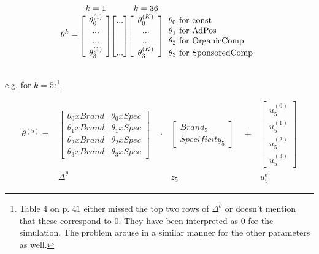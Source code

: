 \begin{equation}
    \theta^k =
        \begin{blockarray}{ccc l}
        k=1 & & k=36 &\\
        \begin{block}{[c][c][c]l}
         \theta^{(1)}_{0} & ... & \theta^{(K)}_{0} & \theta_0 \text{ for const}\\
        ... && ... & \theta_1 \text{ for AdPos}\\
        ... && ... & \theta_2 \text{ for OrganicComp}\\
        \theta^{(1)}_{3} & ... & \theta^{(K)}_{3} & \theta_3 \text{ for SponsoredComp}\\
        \end{block}
        \end{blockarray}
\end{equation}

\begin{center}
    e.g. for $k=5$:\footnote{Table 4 on p. 41 either missed the top two rows of $\Delta^{\theta}$ or doesn't mention that these correspond to 0. They have been interpreted as 0 for the simulation. The problem arouse in a similar manner for the other parameters as well.}
\end{center}
\begin{equation}
    \begin{array}{cccc}
        \theta^{(5)} = 
        &\begin{bmatrix}
        \theta_0 x Brand & \theta_0 x Spec\\
        \theta_1 x Brand & \theta_1 x Spec\\
        \theta_2 x Brand & \theta_2 x Spec\\
        \theta_3 x Brand & \theta_3 x Spec
        \end{bmatrix} 
        \quad \cdot
        &\begin{bmatrix}
        Brand_{5}\\
        Specificity_{5}
        \end{bmatrix}
        \quad + &\begin{bmatrix}
        u^{(0)}_{5}\\
        u^{(1)}_{5}\\
        u^{(2)}_{5}\\
        u^{(3)}_{5}
        \end{bmatrix}\\[30pt]
        &\Delta^{\theta} & z_{5} & u^{\theta}_{5}
    \end{array}
\end{equation}

